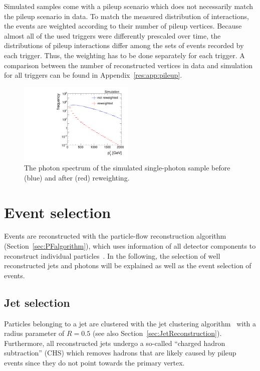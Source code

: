 Simulated samples come with a pileup scenario which does not necessarily match the pileup scenario in data. 
To match the measured distribution of interactions, the events are weighted according to their number of pileup vertices. 
Because almost all of the used triggers were differently prescaled over time, the distributions of pileup interactions differ among the sets of events recorded by each trigger.
Thus, the weighting has to be done separately for each trigger.
A comparison between the number of reconstructed vertices in data and simulation for all triggers can be found in Appendix~\ref{res:app:pileup}.
\begin{figure}[ht]
  \centering
      \includegraphics[width=0.49\textwidth]{figures/resolution/eventSelection/PhotonPtComparison_reweighted.pdf} 
  \caption{The photon \pt spectrum of the \pythiaSix simulated single-photon sample before (blue) and after (red) reweighting.}  
  \label{res:fig:PhotonPtSpectrum}
\end{figure}


\section{Event selection}
\label{res:sec:EventSelection}
Events are reconstructed with the particle-flow reconstruction algorithm (Section~\ref{sec:PFalgorithm}), which uses information of all detector components to reconstruct individual particles~\cite{CMS-PAS-PFT-09-001}.
In the following, the selection of well reconstructed jets and photons will be explained as well as the event selection of \GAMJET events.

\subsection*{Jet selection}
Particles belonging to a jet are clustered with the \antikt jet clustering algorithm~\cite{bib:JetClustering_2008} with a radius parameter of $R=0.5$ (see also Section~\ref{sec:JetReconstruction}).
Furthermore, all reconstructed jets undergo a so-called ``charged hadron subtraction'' (CHS) which removes hadrons that are likely caused by pileup events since they do not point towards the primary vertex.


